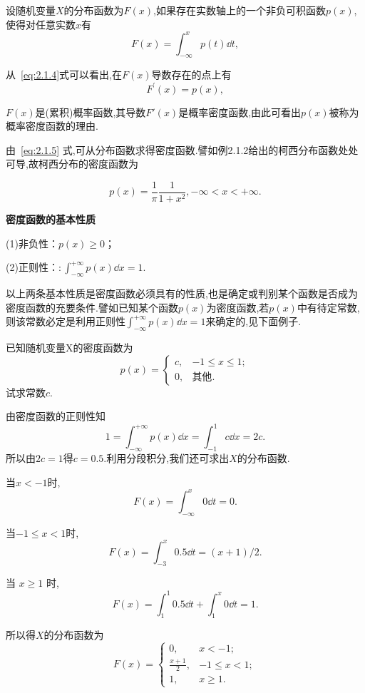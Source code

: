 \begin{definition}{}{}
	设随机变量$ X $的分布函数为$ F(x) $,如果存在实数轴上的一个非负可积函数$ p(x) $,使得对任意实数$ x $有
	\begin{equation}
	  F(x)=\int_{-\infty}^{x} p(t) \dd  t, \label{eq:2.1.4}
	\end{equation}
	
	从~\ref{eq:2.1.4}式可以看出,在$ F(x) $导数存在的点上有
	\begin{equation}
	  F^{\prime}(x) = p(x), \label{eq:2.1.5}
	\end{equation}
	
	$ F(x) $是(累积)概率函数,其导数$ F'(x) $是概率密度函数,由此可看出$ p(x) $被称为概率密度函数的理由.
	
	由~\eqref{eq:2.1.5} 式,可从分布函数求得密度函数.譬如例2.1.2给出的柯西分布函数处处可导,故柯西分布的密度函数为
	
	\[
	p(x)=\frac{1}{\pi} \frac{1}{1+x^{2}},-\infty < x < +\infty.
	\]
\end{definition}

\textbf{密度函数的基本性质 }

(1)非负性：$p(x) \geqslant 0$；

(2)正则性：$: \int_{-\infty}^{+\infty} p(x) \dd  x=1$.

以上两条基本性质是密度函数必须具有的性质,也是确定或判别某个函数是否成为密度函数的充要条件.譬如已知某个函数$ p(x) $为密度函数,若$ p(x) $中有待定常数,则该常数必定是利用正则性$\int_{-\infty}^{+\infty} p(x) \dd  x=1$来确定的,见下面例子.

\begin{example}
	已知随机变量X的密度函数为
	\[
	  p(x) = \begin{cases}
	    c, & -1 \leqslant x \leqslant 1; \\
	    0, & \text{其他}.
	\end{cases}
	\]
	试求常数$ c $.
\end{example}
	
\begin{solution}
  由密度函数的正则性知
	\[
	  1=\int_{-\infty}^{+\infty} p(x) \dd  x=\int_{-1}^{1} c \dd  x=2 c.
	\]
所以由$ 2c=1 $得$ c=0.5 $.利用分段积分,我们还可求出$ X $的分布函数.
	
	当$ x<-1 $时,
	\[
	F(x)=\int_{-\infty}^{x} 0 \dd  t=0.
	\]
	
	当$-1 \leqslant x<1$时,
	\[
	F(x)=\int_{-3}^{x} 0.5 \dd  t=(x+1) / 2.
	\]
	
	当 $x \geqslant 1$ 时,
	\[
	F(x)=\int_{1}^{1} 0.5 \dd  t+\int_{1}^{x} 0 \dd  t=1.
	\]
	
	所以得$ X $的分布函数为
	\[
	  F(x) = \begin{cases}
	    0, & x<-1 ;\\
	    \frac{x+1}{2}, & -1 \leqslant x<1 ; \\
	    1, & x \geqslant 1.
	  \end{cases}
	\]
\end{solution}


